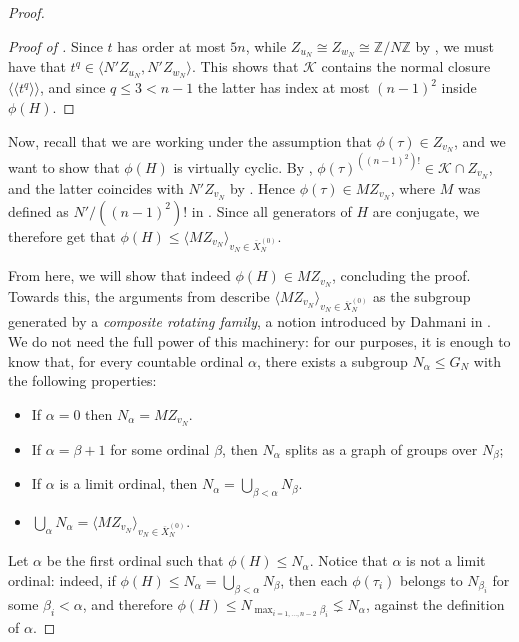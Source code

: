 \documentclass[svgnames]{amsart}
\theoremstyle{plain}
\newenvironment{claimproof}{\renewcommand{\qedsymbol}{$\blacksquare$}\begin{proof}}{\end{proof}}
\theoremstyle{definition}
\newcommand{\Z}{\mathbb{Z}}
\newcommand{\ov}[1]{\overline{#1}}
\begin{document}
\begin{proof}
\begin{claimproof}[Proof of ]
    Since $t$ has order at most $5n$, while $Z_{u_N}\cong Z_{w_N}\cong \Z/N\Z$ by , we must have that $t^q\in \langle N'Z_{u_N}, N'Z_{w_N}\rangle$. This shows that $\mathcal K$ contains the normal closure $\langle\langle t^q\rangle\rangle$, and since $q\le 3<n-1$ the latter has index at most $(n-1)^2$ inside $\phi(H)$.
    \end{claimproof}

    Now, recall that we are working under the assumption that $\phi(\tau)\in Z_{v_N}$, and we want to show that $\phi(H)$ is virtually cyclic. By , $\phi(\tau)^{((n-1)^2)!}\in \mathcal K\cap Z_{v_N}$, and the latter coincides with $N'Z_{v_N}$ by . Hence $\phi(\tau)\in M Z_{v_N}$, where $M$ was defined as $N'/((n-1)^2)!$ in . Since all generators of $H$ are conjugate, we therefore get that $\phi(H)\le \langle MZ_{v_N}\rangle_{v_N\in \ov X_N^{(0)}}$. 

    From here, we will show that indeed $\phi(H)\in MZ_{v_N}$, concluding the proof. Towards this, the arguments from \cite[Section 3]{short_HHG:II} describe $\langle MZ_{v_N}\rangle_{v_N\in \ov X_N^{(0)}}$ as the subgroup generated by a \emph{composite rotating family}, a notion introduced by Dahmani in \cite{dahmani:rotating}. We do not need the full power of this machinery: for our purposes, it is enough to know that, for every countable ordinal $\alpha$, there exists a subgroup $N_\alpha\le G_N$ with the following properties:
    \begin{itemize}
        \item If $\alpha=0$ then $N_{\alpha}=MZ_{v_N}$.
        \item If $\alpha=\beta+1$ for some ordinal $\beta$, then $N_{\alpha}$ splits as a graph of groups over $N_{\beta}$;
        \item If $\alpha$ is a limit ordinal, then $N_{\alpha}=\bigcup_{\beta<\alpha} N_\beta$.
        \item $\bigcup_{\alpha} N_\alpha=\langle MZ_{v_N}\rangle_{v_N\in \ov X_N^{(0)}}$.
    \end{itemize}
    Let $\alpha$ be the first ordinal such that $\phi(H)\le N_\alpha$. Notice that $\alpha$ is not a limit ordinal: indeed, if $\phi(H)\le N_{\alpha}=\bigcup_{\beta<\alpha} N_\beta$, then each $\phi(\tau_i)$ belongs to $N_{\beta_i}$ for some $\beta_i<\alpha$, and therefore $\phi(H)\le N_{\max_{i=1,\ldots, n-2} \beta_i}\lneq N_\alpha$, against the definition of $\alpha$. 


\end{proof}
\end{document}
